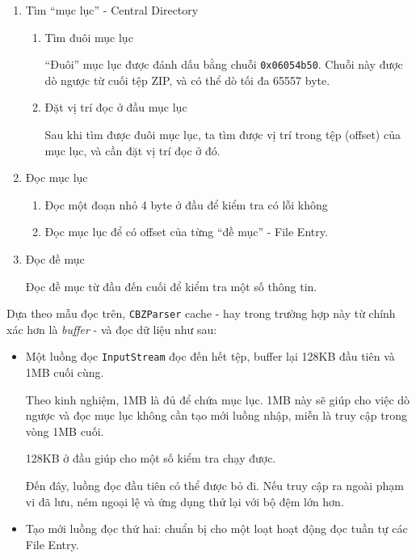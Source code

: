 \documentclass[
]{article}
\begin{document}
\begin{enumerate}
\item
  Tìm ``mục lục'' - Central Directory

  \begin{enumerate}
  \def\labelenumii{\arabic{enumii}.}
  \item
    Tìm đuôi mục lục

    ``Đuôi'' mục lục được đánh dấu bằng chuỗi \texttt{0x06054b50}. Chuỗi
    này được dò ngược từ cuối tệp ZIP, và có thể dò tối đa 65557 byte.
  \item
    Đặt vị trí đọc ở đầu mục lục

    Sau khi tìm được đuôi mục lục, ta tìm được vị trí trong tệp (offset)
    của mục lục, và cần đặt vị trí đọc ở đó.
  \end{enumerate}
\item
  Đọc mục lục

  \begin{enumerate}
  \def\labelenumii{\arabic{enumii}.}
    \item
    Đọc một đoạn nhỏ 4 byte ở đầu để kiểm tra có lỗi không
  \item
    Đọc mục lục để có offset của từng ``đề mục'' - File Entry.
  \end{enumerate}
\item
  Đọc đề mục

  Đọc đề mục từ đầu đến cuối để kiểm tra một số thông tin.
\end{enumerate}

Dựa theo mẫu đọc trên, \texttt{CBZParser} cache - hay trong trường hợp
này từ chính xác hơn là \emph{buffer} - và đọc dữ liệu như sau:

\begin{itemize}
\item
  Một luồng đọc \texttt{InputStream} đọc đến hết tệp, buffer lại 128KB
  đầu tiên và 1MB cuối cùng.

  Theo kinh nghiệm, 1MB là đủ để chứa mục lục. 1MB này sẽ giúp cho việc
  dò ngược và đọc mục lục không cần tạo mới luồng nhập, miễn là truy cập
  trong vòng 1MB cuối.

  128KB ở đầu giúp cho một số kiểm tra chạy được.

  Đến đây, luồng đọc đầu tiên có thể được bỏ đi. Nếu truy cập ra ngoài
  phạm vi đã lưu, ném ngoại lệ và ứng dụng thử lại với bộ đệm lớn hơn.
\item
  Tạo mới luồng đọc thứ hai: chuẩn bị cho một loạt hoạt động đọc tuần tự
  các File Entry.
\end{itemize}
\end{document}
